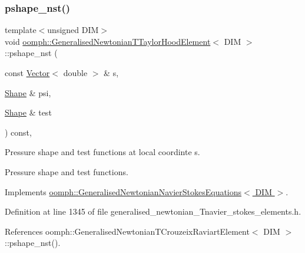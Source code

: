 \subsubsection{\texorpdfstring{pshape\+\_\+nst()}{pshape\_nst()}\hspace{0.1cm}{\footnotesize\ttfamily [2/4]}}
{\footnotesize\ttfamily template$<$unsigned D\+IM$>$ \\
void \hyperlink{classoomph_1_1GeneralisedNewtonianTTaylorHoodElement}{oomph\+::\+Generalised\+Newtonian\+T\+Taylor\+Hood\+Element}$<$ D\+IM $>$\+::pshape\+\_\+nst (\begin{DoxyParamCaption}\item[{const \hyperlink{classoomph_1_1Vector}{Vector}$<$ double $>$ \&}]{s,  }\item[{\hyperlink{classoomph_1_1Shape}{Shape} \&}]{psi,  }\item[{\hyperlink{classoomph_1_1Shape}{Shape} \&}]{test }\end{DoxyParamCaption}) const\hspace{0.3cm}{\ttfamily [inline]}, {\ttfamily [virtual]}}



Pressure shape and test functions at local coordinte s. 

Pressure shape and test functions. 

Implements \hyperlink{classoomph_1_1GeneralisedNewtonianNavierStokesEquations_afb01a54f377b1bebe141ed8e11ced138}{oomph\+::\+Generalised\+Newtonian\+Navier\+Stokes\+Equations$<$ D\+I\+M $>$}.



Definition at line 1345 of file generalised\+\_\+newtonian\+\_\+\+Tnavier\+\_\+stokes\+\_\+elements.\+h.



References oomph\+::\+Generalised\+Newtonian\+T\+Crouzeix\+Raviart\+Element$<$ D\+I\+M $>$\+::pshape\+\_\+nst().

\mbox{\label{classoomph_1_1GeneralisedNewtonianTTaylorHoodElement_ad796a7d9a9a43ea9ea8451c620c10325}} 
